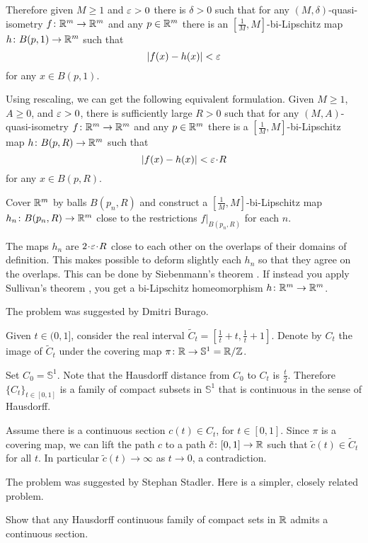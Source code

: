 Therefore given $M\ge 1$ and $\varepsilon>0$ there is $\delta>0$ such that 
for any $(M,\delta)$-quasi-isometry $f\colon\mathbb{R}^m\to\mathbb{R}^m$ and any $p\in \mathbb{R}^m$
there is an $[\tfrac1M,M]$-bi-Lipschitz map $h\colon B(p,1)\to \mathbb{R}^m$
such that
\[|f(x)-h(x)|<\varepsilon\]
for any $x\in B(p,1)$.

Using rescaling, we can get the following equivalent formulation. 
Given $M\ge 1$, $A\ge 0$, and $\varepsilon>0$,
there is sufficiently large $R>0$ such that for any $(M,A)$-quasi-isometry 
$f\colon\mathbb{R}^m\to\mathbb{R}^m$ and any $p\in\mathbb{R}^m$ there is a $[\tfrac1M,M]$-bi-Lipschitz map $h\colon B(p,R)\to \mathbb{R}^m$
such that 
\[|f(x)-h(x)|<\eps\cdot R\]
for any $x\in B(p,R)$.

Cover $\mathbb{R}^m$ by balls $B(p_n,R)$ and construct a $[\tfrac1M,M]$-bi-Lipschitz map $h_n\colon B(p_n,R)\to \mathbb{R}^m$ close to the restrictions $f|_{B(p_n,R)}$ for each $n$.

The maps $h_n$ are $2\cdot \eps\cdot R$ close to each other on the overlaps of their domains of definition.
This makes possible to deform slightly each $h_n$ so that they agree on the overlaps.
This can be done by Siebenmann's theorem \cite{siebenmann}.
If instead you apply Sullivan's theorem \cite{sullivan}, you get a bi-Lipschitz homeomorphism $h\:\RR^m\z\to\RR^m$.\qeds


The problem was suggested by Dmitri Burago.





Given $t\in (0,1]$, consider the real interval $\tilde C_t=[\tfrac 1t+t, \tfrac 1t+1]$.
Denote by $C_t$ the image of $\tilde C_t$ under the covering map $\pi\colon\mathbb{R}\to \mathbb{S}^1=\mathbb{R}/\mathbb{Z}$.

Set $C_0=\mathbb{S}^1$.
Note that the Hausdorff distance from $C_0$ to $C_t$ is $\tfrac t2$.
Therefore $\{C_t\}_{t\in[0,1]}$ is a family of compact subsets in $\mathbb{S}^1$ that is continuous in the sense of Hausdorff.

\medskip

Assume there is a continuous section $c(t)\in C_t$, for $t\in [0,1]$.
Since $\pi$ is a covering map,
we can lift the path $c$ to a path $\tilde c\colon[0,1]\to \mathbb{R}$ such that $\tilde c(t)\in \tilde C_t$ for all $t$.
In particular $\tilde c(t)\to\infty$ as $t\to0$,
a contradiction.\qeds


The problem was suggested by Stephan Stadler.
Here is a simpler, closely related problem.

\begin{pr}
Show that any Hausdorff continuous family of compact sets in $\mathbb{R}$ admits a continuous section.
\end{pr}


